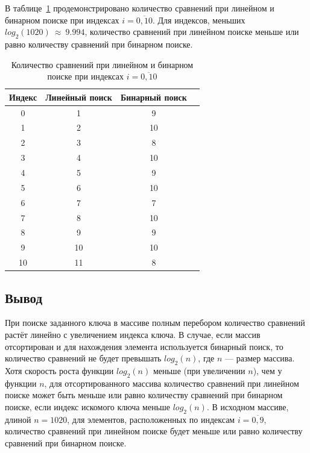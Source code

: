 В таблице~\ref{table:comparisons} продемонстрировано количество сравнений при линейном и бинарном поиске при индексах $i = \overline{0,10}$. Для индексов, меньших $log_2(1020)~\approx~9.994$, количество сравнений при линейном поиске меньше или равно количеству сравнений при бинарном поиске.

\begin{table}[htb]
\caption{\centering Количество сравнений при линейном и бинарном поиске при индексах $i = \overline{0, 10}$}
\small
\centering\begin{tabular}{|c|c|c|c|}
        \hline
        \textbf{Индекс} & \textbf{Линейный поиск} & \textbf{Бинарный поиск} \\
        \hline
        0 & 1 & 9 \\
        \hline
        1 & 2 & 10 \\
        \hline
        2 & 3 & 8 \\
        \hline
        3 & 4 & 10 \\
        \hline
        4 & 5 & 9 \\
        \hline
        5 & 6 & 10 \\
        \hline
        6 & 7 & 7 \\
        \hline
        7 & 8 & 10 \\
        \hline
        8 & 9 & 9 \\
        \hline
        9 & 10 & 10 \\
        \hline
        10 & 11 & 8 \\
        \hline
    \end{tabular}
\label{table:comparisons}
\end{table}

\newpage
\subsection{Вывод}

При поиске заданного ключа в массиве полным перебором количество сравнений растёт линейно с увеличением индекса ключа. В случае, если массив отсортирован и для нахождения элемента используется бинарный поиск, то количество сравнений не будет превышать $log_2(n)$, где $n$ --- размер массива. Хотя скорость роста функции $log_2(n)$ меньше (при увеличении $n$), чем у функции $n$, для отсортированного массива количество сравнений при линейном поиске может быть меньше или равно количеству сравнений при бинарном поиске, если индекс искомого ключа меньше $log_2(n)$. В исходном массиве, длиной $n = 1020$, для элементов, расположенных по индексам $i = \overline{0, 9}$, количество сравнений при линейном поиске будет меньше или равно количеству сравнений при бинарном поиске.
